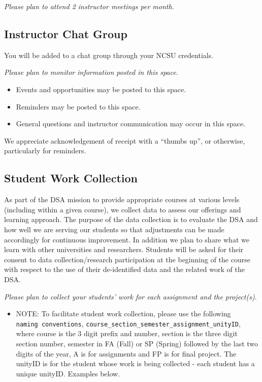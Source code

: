 \documentclass[
]{book}
\providecommand{\tightlist}{%
  \setlength{\itemsep}{0pt}\setlength{\parskip}{0pt}}
\begin{document}
{ \emph{Please plan to attend 2 instructor meetings per month.} }

\hypertarget{instructor-chat-group}{%
\subsection{Instructor Chat Group}\label{instructor-chat-group}}

You will be added to a chat group through your NCSU credentials.

{ \emph{Please plan to monitor information posted in this space.} }

\begin{itemize}
\tightlist
\item
  Events and opportunities may be posted to this space.
\item
  Reminders may be posted to this space.
\item
  General questions and instructor communication may occur in this space.
\end{itemize}

We appreciate acknowledgement of receipt with a ``thumbs up'', or otherwise, particularly for reminders.

\hypertarget{student-work-collection}{%
\subsection{Student Work Collection}\label{student-work-collection}}

As part of the DSA mission to provide appropriate courses at various levels (including within a given course), we collect data to assess our offerings and learning approach. The purpose of the data collection is to evaluate the DSA and how well we are serving our students so that adjustments can be made accordingly for continuous improvement. In addition we plan to share what we learn with other universities and researchers. Students will be asked for their consent to data collection/research participation at the beginning of the course with respect to the use of their de-identified data and the related work of the DSA.

{ \emph{Please plan to collect your students' work for each assignment and the project(s)}. }

\begin{itemize}
\tightlist
\item
  NOTE: To facilitate student work collection, please use the following \texttt{naming\ conventions}, \texttt{course\_section\_semester\_assignment\_unityID}, where course is the 3 digit prefix and number, section is the three digit section number, semester in FA (Fall) or SP (Spring) followed by the last two digits of the year, A is for assignments and FP is for final project. The unityID is for the student whose work is being collected - each student has a unique unityID. Examples below.
\end{itemize}
\end{document}
